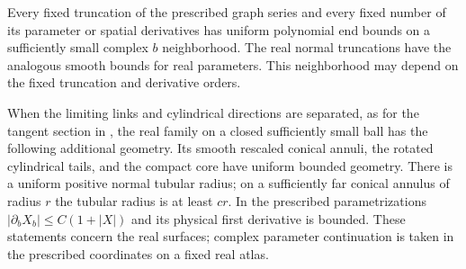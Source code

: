 \begin{proposition}
\begin{enumerate}
\begin{equation}
 \end{equation}
 Every fixed truncation of the prescribed graph series and every fixed
 number of its parameter or spatial derivatives has uniform polynomial
 end bounds on a sufficiently small complex $b$ neighborhood.  The real
 normal truncations have the analogous smooth bounds for real parameters.
 This neighborhood may
 depend on the fixed truncation and derivative orders.
\end{enumerate}
When the limiting links and cylindrical directions are separated, as for
the tangent section in , the real family on a closed
sufficiently small ball has the following additional geometry.  Its smooth
rescaled conical annuli, the rotated cylindrical tails, and the compact
core have uniform bounded geometry.  There is a uniform positive normal
tubular radius; on a sufficiently far conical annulus of radius $r$ the tubular radius is
at least $cr$.  In the prescribed parametrizations
$|\partial_bX_b|\le C(1+|X|)$ and its physical first derivative is
bounded.  These statements concern the real surfaces; complex parameter
continuation is taken in the prescribed coordinates on a fixed real atlas.
\end{proposition}

